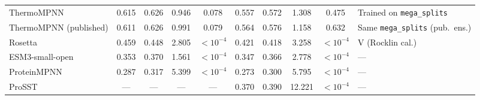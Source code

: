 \begin{table}[H]
{\begin{tabular}{lccccccccl}
ThermoMPNN & 0.615 & 0.626 & 0.946 & 0.078 & 0.557 & 0.572 & 1.308 & 0.475 & Trained on \texttt{mega\_splits} \\
ThermoMPNN (published) & 0.611 & 0.626 & 0.991 & 0.079 & 0.564 & 0.576 & 1.158 & 0.632 & Same \texttt{mega\_splits} (pub.\ ens.) \\
Rosetta & 0.459 & 0.448 & 2.805 & $<10^{-4}$ & 0.421 & 0.418 & 3.258 & $<10^{-4}$ & V (Rocklin cal.) \\
ESM3-small-open & 0.353 & 0.370 & 1.561 & $<10^{-4}$ & 0.347 & 0.366 & 2.778 & $<10^{-4}$ & --- \\
ProteinMPNN & 0.287 & 0.317 & 5.399 & $<10^{-4}$ & 0.273 & 0.300 & 5.795 & $<10^{-4}$ & --- \\
ProSST & --- & --- & --- & --- & 0.370 & 0.390 & 12.221 & $<10^{-4}$ & --- \\
\bottomrule
\end{tabular}
}
\end{table}
